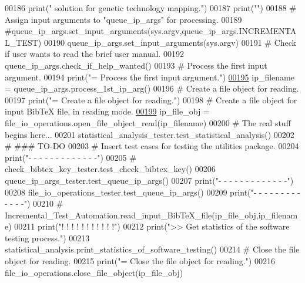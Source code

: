 \begin{DoxyCode}
00186     print(\textcolor{stringliteral}{" solution for genetic technology mapping."})
00187     print(\textcolor{stringliteral}{""})
00188     \textcolor{comment}{# Assign input arguments to "queue\_ip\_args" for processing.}
00189     \textcolor{comment}{#queue\_ip\_args.set\_input\_arguments(sys.argv,queue\_ip\_args.INCREMENTAL\_TEST)}
00190     queue\_ip\_args.set\_input\_arguments(sys.argv)
00191     \textcolor{comment}{# Check if user wants to read the brief user manual.}
00192     queue\_ip\_args.check\_if\_help\_wanted()
00193     \textcolor{comment}{# Process the first input argument.}
00194     print(\textcolor{stringliteral}{"=    Process the first input argument."})
\hypertarget{incremental__test_8py_source_l00195}{}\hyperlink{namespaceincremental__test_ab5a7aa877c2dae060e3fd03a472cbbf3}{00195}     ip\_filename = queue\_ip\_args.process\_1st\_ip\_arg()
00196     \textcolor{comment}{# Create a file object for reading.}
00197     print(\textcolor{stringliteral}{"=    Create a file object for reading."})
00198     \textcolor{comment}{# Create a file object for input BibTeX file, in reading mode.}
\hypertarget{incremental__test_8py_source_l00199}{}\hyperlink{namespaceincremental__test_aaf431f9a2a2d1172f09263453438e4f4}{00199}     ip\_file\_obj = file\_io\_operations.open\_file\_object\_read(ip\_filename)
00200     \textcolor{comment}{# The real stuff begins here...}
00201     statistical\_analysis\_tester.test\_statistical\_analysis()
00202     \textcolor{comment}{#   ### TO-DO}
00203     \textcolor{comment}{# Insert test cases for testing the utilities package.}
00204     print(\textcolor{stringliteral}{"-    -   -   -   -   -   -   -   -   -   -   -   -"})
00205 \textcolor{comment}{#   check\_bibtex\_key\_tester.test\_check\_bibtex\_key()}
00206     queue\_ip\_args\_tester.test\_queue\_ip\_args()
00207     print(\textcolor{stringliteral}{"-    -   -   -   -   -   -   -   -   -   -   -   -"})
00208     file\_io\_operations\_tester.test\_queue\_ip\_args()
00209     print(\textcolor{stringliteral}{"-    -   -   -   -   -   -   -   -   -   -   -   -"})
00210 \textcolor{comment}{#   Incremental\_Test\_Automation.read\_input\_BibTeX\_file(ip\_file\_obj,ip\_filename)}
00211     print(\textcolor{stringliteral}{"!    !   !   !   !   !   !   !   !   !   !"})
00212     print(\textcolor{stringliteral}{">>   Get statistics of the software testing process."})
00213     statistical\_analysis.print\_statistics\_of\_software\_testing()
00214     \textcolor{comment}{# Close the file object for reading.}
00215     print(\textcolor{stringliteral}{"=    Close the file object for reading."})
00216     file\_io\_operations.close\_file\_object(ip\_file\_obj)
\end{DoxyCode}
